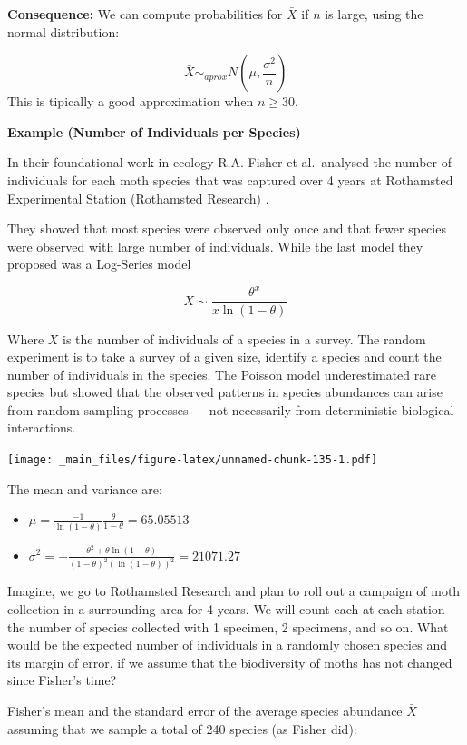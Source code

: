 \documentclass[
]{book}
\providecommand{\tightlist}{%
  \setlength{\itemsep}{0pt}\setlength{\parskip}{0pt}}
\begin{document}
\textbf{Consequence:} We can compute probabilities for \(\bar{X}\) if \(n\) is large, using the normal distribution:

\[\bar{X} \sim_{aprox}  N(\mu, \frac{\sigma^2}{n})\]
This is tipically a good approximation when \(n\geq 30\).

\textbf{Example (Number of Individuals per Species)}

In their foundational work in ecology R.A. Fisher et al.~analysed the number of individuals for each moth species that was captured over 4 years at Rothamsted Experimental Station (Rothamsted Research) \citep{fisher1943species}.

They showed that most species were observed only once and that fewer species were observed with large number of individuals. While the last model they proposed was a Log-Series model

\[X \sim \frac{-\theta^x}{x\ln(1-\theta)}\]

Where \(X\) is the number of individuals of a species in a survey. The random experiment is to take a survey of a given size, identify a species and count the number of individuals in the species. The Poisson model underestimated rare species but showed that the observed patterns in species abundances can arise from random sampling processes --- not necessarily from deterministic biological interactions.

\texttt{[image: \_main\_files/figure-latex/unnamed-chunk-135-1.pdf]}

The mean and variance are:

\begin{itemize}
\tightlist
\item
  \(\mu= {\frac {-1}{\ln(1-\theta)}}{\frac {\theta}{1-\theta}}=65.05513\)
\item
  \(\sigma^2= -{\frac {\theta^{2}+\theta\ln(1-\theta)}{(1-\theta)^{2}(\ln(1-\theta))^{2}}}=21071.27\)
\end{itemize}

Imagine, we go to Rothamsted Research and plan to roll out a campaign of moth collection in a surrounding area for 4 years. We will count each at each station the number of species collected with 1 specimen, 2 specimens, and so on. What would be the expected number of individuals in a randomly chosen species and its margin of error, if we assume that the biodiversity of moths has not changed since Fisher's time?

Fisher's mean and the standard error of the average species abundance \(\bar{X}\) assuming that we sample a total of 240 species (as Fisher did):
\end{document}

